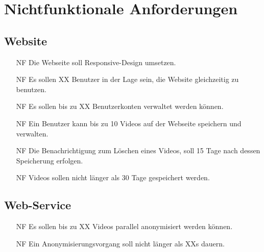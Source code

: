 \section{Nichtfunktionale Anforderungen}

\subsection{Website}
\begin{itemize}
\item[NF] Die Webseite soll Responsive-Design umsetzen.

\item[NF] Es sollen XX Benutzer in der Lage sein, die Website gleichzeitig zu benutzen.

\item[NF] Es sollen bis zu XX Benutzerkonten verwaltet werden können.

\item[NF] Ein Benutzer kann bis zu 10 Videos auf der Webseite speichern und verwalten.

\item[NF] Die Benachrichtigung zum Löschen eines Videos, soll 15 Tage nach dessen Speicherung erfolgen.

\item[NF] Videos sollen nicht länger als 30 Tage gespeichert werden.

\end{itemize}

\subsection{Web-Service}
\begin{itemize}

\item[NF] Es sollen bis zu XX Videos parallel anonymisiert werden können.

\item[NF] Ein Anonymisierungsvorgang soll nicht länger als XXs dauern.
\end{itemize}


